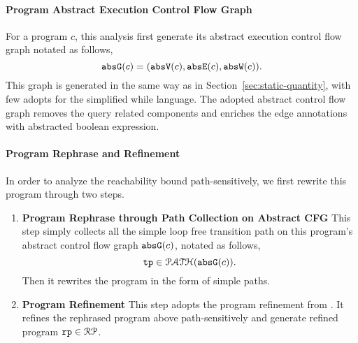 \paragraph{Program Abstract Execution Control Flow Graph}
For a program $c$, this analysis first generate its abstract execution control flow graph notated as follows,
\[\mathtt{abs}{\mathtt{G}}(c) =(\mathtt{abs}{\mathtt{V}}(c), \mathtt{abs}{\mathtt{E}}(c), \mathtt{abs}{\mathtt{W}}(c)).\]
This graph is generated in the same way as in Section~\ref{sec:static-quantity}, with few adopts for the simplified while language.
The adopted abstract control flow graph removes the query related components and
enriches the edge annotations with abstracted boolean expression.
\paragraph{Program Rephrase and Refinement}
In order to analyze the reachability bound path-sensitively, we first rewrite this program through two steps.
\\
\begin{enumerate}
\item \textbf{ Program Rephrase through Path Collection on Abstract CFG}
This step simply collects all the simple loop free transition path
on this program's abstract control flow graph $\mathtt{abs}{\mathtt{G}}(c)$, notated as follows,
\[ \mathtt{tp} \in \mathcal{PATH}(\mathtt{abs}{\mathtt{G}}(c)). \]
Then it rewrites the program in the form of simple paths.
\item \textbf{ Program Refinement} This step adopts the program refinement from \cite{GulwaniJK09}.
It refines the rephrased program above path-sensitively and generate   refined program 
$\mathtt{rp} \in \mathcal{RP}$.
\end{enumerate}
